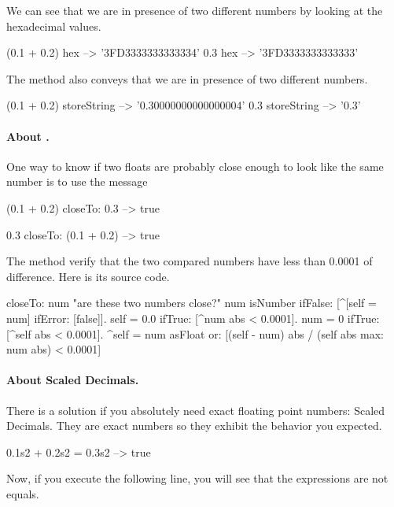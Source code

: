 \documentclass[a4paper,10pt,twoside]{book}
\begin{document}
We can see that we are in presence of two different numbers by looking at the hexadecimal values. 

\begin{code}{}
(0.1 + 0.2) hex 
	--> '3FD3333333333334'
0.3 hex 
	--> '3FD3333333333333' 
\end{code}

	
The method  also conveys that we are in presence of two different numbers.
		
\begin{code}{}
(0.1 + 0.2) storeString 
	--> 	'0.30000000000000004' 
0.3 storeString 
	-->	'0.3'
\end{code}	
		
\paragraph{About .} One way to know if two floats are probably close enough to look like the same number is to use the message 

\begin{code}{}
(0.1 + 0.2) closeTo: 0.3
	--> true

0.3 closeTo: (0.1 + 0.2)
	--> true
\end{code}		

The method  verify that the two compared numbers have less than 0.0001 of difference. Here is its source code.  

\begin{code}{}
closeTo: num
 	"are these two numbers close?"
	num isNumber ifFalse: [^[self = num] ifError: [false]].
	self = 0.0 ifTrue: [^num abs < 0.0001].
	num = 0 ifTrue: [^self abs < 0.0001].
	^self = num asFloat
		or: [(self - num) abs / (self abs max: num abs) < 0.0001]	
\end{code}

		
\paragraph{About Scaled Decimals.} There is a solution if you absolutely need exact floating point numbers: Scaled Decimals. They are exact numbers so they exhibit the behavior you expected.

\begin{code}{}
0.1s2 + 0.2s2 = 0.3s2
	--> true
\end{code}		

Now, if you execute the following line, you will see that the expressions are not equals.
\end{document}
